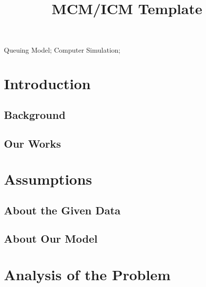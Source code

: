 \documentclass{mcmthesis}
\title{MCM/ICM Template}
\begin{document}
\begin{summarysheet}
	
\end{summarysheet}

\begin{keywords}
Queuing Model; \quad Computer Simulation; 
\end{keywords}
\maketitle


\tableofcontents
\newpage

\section{Introduction}

\subsection{Background}
	

\subsection{Our Works}
	
	
\section{Assumptions}

\subsection{About the Given Data}
	

\subsection{About Our Model}
	

\section{Analysis of the Problem}
	
\end{document}
